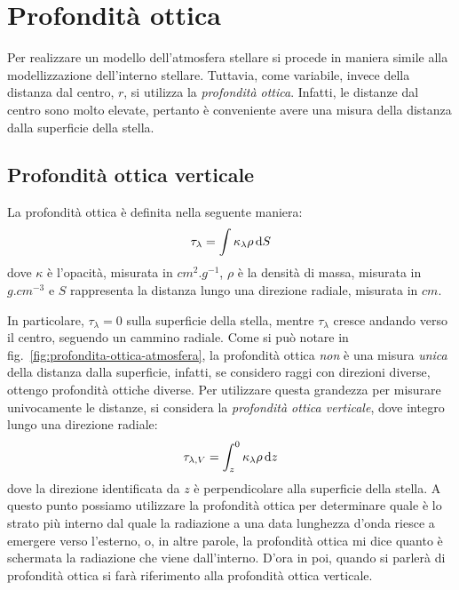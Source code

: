 \section{Profondità ottica}\label{sec:profondità-ottica}
Per realizzare un modello dell'atmosfera stellare si procede in maniera simile alla modellizzazione dell'interno stellare. Tuttavia, come variabile, invece della distanza dal centro, $r$, si utilizza la \emph{profondità ottica}. Infatti, le distanze dal centro sono molto elevate, pertanto è conveniente avere una misura della distanza dalla superficie della stella. 

\subsection{Profondità ottica verticale}
La profondità ottica è definita nella seguente maniera:
\begin{equation}\label{eq:profondità-ottica-atmosfera}
    \tau_\lambda = \int \kappa_\lambda \rho \mathop{\mathrm{{}d}}\mathopen{} S
\end{equation}
dove $\kappa$ è l'opacità, misurata in $\si{cm^2.g^{-1}}$, $\rho$ è la densità di massa, misurata in $\si{g.cm^{-3}}$ e $S$ rappresenta la distanza lungo una direzione radiale, misurata in $\si{cm}$.



In particolare, $\tau_\lambda = 0$ sulla superficie della stella, mentre $\tau_\lambda$ cresce andando verso il centro, seguendo un cammino radiale. Come si può notare in fig.~\ref{fig:profondita-ottica-atmosfera}, la profondità ottica \emph{non} è una misura \emph{unica} della distanza dalla superficie, infatti, se considero raggi con direzioni diverse, ottengo profondità ottiche diverse. Per utilizzare questa grandezza per misurare univocamente le distanze, si considera la \emph{profondità ottica verticale}, dove integro lungo una direzione radiale:
\begin{equation}\label{eq:profondità-ottica-verticale}
    \tau_{\lambda, V} = \int_z^0 \kappa_\lambda \rho \mathop{\mathrm{{}d}}\mathopen{} z
\end{equation}
dove la direzione identificata da $z$ è perpendicolare alla superficie della stella. A questo punto possiamo utilizzare la profondità ottica per determinare quale è lo strato più interno dal quale la radiazione a una data lunghezza d'onda riesce a emergere verso l’esterno, o, in altre parole, la profondità ottica mi dice quanto è schermata la radiazione che viene dall'interno. D'ora in poi, quando si parlerà di profondità ottica si farà riferimento alla profondità ottica verticale.

